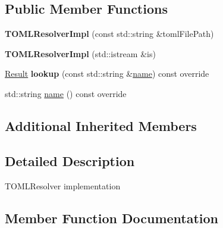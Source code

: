\subsection*{Public Member Functions}
\begin{DoxyCompactItemize}
\item 
\mbox{\label{classTOMLResolver_1_1TOMLResolverImpl_a297c93ec008519e79192844d483273ac}} 
{\bfseries T\+O\+M\+L\+Resolver\+Impl} (const std\+::string \&toml\+File\+Path)
\item 
\mbox{\label{classTOMLResolver_1_1TOMLResolverImpl_acee3fe2b048200875c6ee00aacad76ac}} 
{\bfseries T\+O\+M\+L\+Resolver\+Impl} (std\+::istream \&is)
\item 
\mbox{\label{classTOMLResolver_1_1TOMLResolverImpl_aebc6940c543f3b12484aa2735a6fcf1b}} 
\hyperlink{classtheoria_1_1config_1_1ConfigVariableResolver_af27a85262d802c9ad4ecb1179efaf447}{Result} {\bfseries lookup} (const std\+::string \&\hyperlink{classTOMLResolver_1_1TOMLResolverImpl_a5b9f36aca6c20a81b18b078fa74c3c14}{name}) const override
\item 
std\+::string \hyperlink{classTOMLResolver_1_1TOMLResolverImpl_a5b9f36aca6c20a81b18b078fa74c3c14}{name} () const override
\end{DoxyCompactItemize}
\subsection*{Additional Inherited Members}


\subsection{Detailed Description}
T\+O\+M\+L\+Resolver implementation 

\subsection{Member Function Documentation}
\mbox{\label{classTOMLResolver_1_1TOMLResolverImpl_a5b9f36aca6c20a81b18b078fa74c3c14}} 
